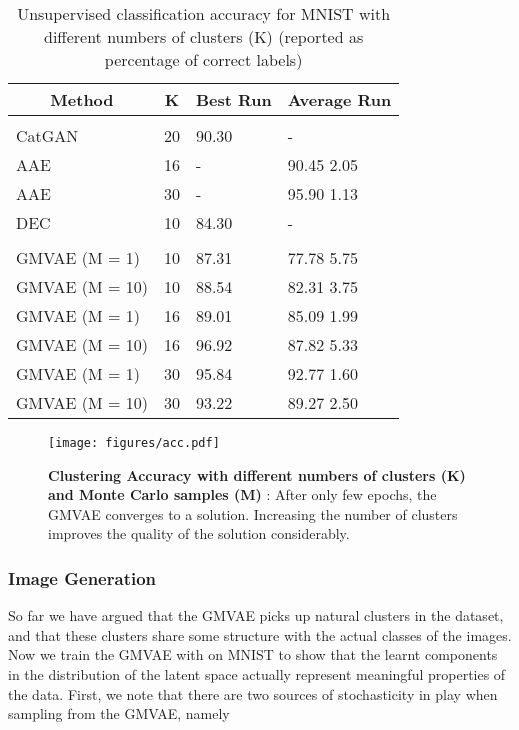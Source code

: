 \documentclass{article} \usepackage{iclr2017_conference,times}
\begin{document}
\begin{table}[t]
\caption{Unsupervised classification accuracy for MNIST with different numbers of clusters (K) (reported as percentage of correct labels)}
\label{table:mnist-cluster-table}
\centering
\begin{tabular}{llll}
\multicolumn{1}{c}{\bf Method}  &\multicolumn{1}{c}{\bf K}		&\multicolumn{1}{c}{\bf Best Run } &\multicolumn{1}{c}{\bf Average Run}
\\ \hline \\
CatGAN \citep{springenberg2015unsupervised} &20	& 90.30 & - \\
AAE \citep{makhzani2015adversarial}&16& - & 90.45  2.05\\
AAE \citep{makhzani2015adversarial} &30	&-& 95.90  1.13 \\
DEC  \citep{xie2015unsupervised} &10 & 84.30 & - \\
\\
GMVAE (M = 1) & 10  & 87.31 &  77.78  5.75 \\
GMVAE (M = 10) & 10 & 88.54  & 82.31  3.75 \\
GMVAE (M = 1) &16 &	89.01 & 85.09  1.99  \\
GMVAE (M = 10) &16 & 96.92  & 87.82  5.33 	\\
GMVAE (M = 1) &30 &	95.84 & 92.77  1.60 \\
GMVAE (M = 10) &30 & 93.22 & 89.27  2.50	\\
\end{tabular}
\end{table}

\begin{figure}[h]
\centering
 \texttt{[image: figures/acc.pdf]}
\caption{\textbf{Clustering Accuracy with different numbers of clusters (K) and Monte Carlo samples (M)} : After only few epochs, the GMVAE converges to a solution. Increasing the number of clusters improves the quality of the solution considerably.}
\label{fig:acc}
\end{figure}

\subsubsection{Image Generation}
So far we have argued that the GMVAE picks up natural clusters in the dataset, and that these clusters share some structure with the actual classes of the images. Now we train the GMVAE with  on MNIST to show that the learnt components in the distribution of the latent space actually represent meaningful properties of the data. First, we note that there are two sources of stochasticity in play when sampling from the GMVAE, namely
\end{document}
